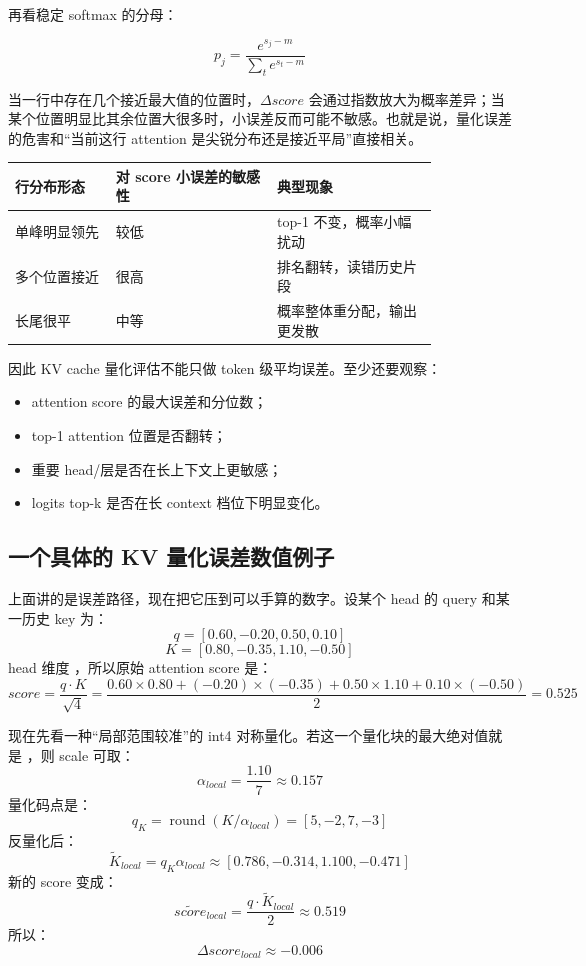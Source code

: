 再看稳定 softmax 的分母：

\[
p_j=\frac{e^{s_j-m}}{\sum_t e^{s_t-m}}
\]

当一行中存在几个接近最大值的位置时，\(\Delta score\) 会通过指数放大为概率差异；当某个位置明显比其余位置大很多时，小误差反而可能不敏感。也就是说，量化误差的危害和“当前这行 attention 是尖锐分布还是接近平局”直接相关。

\begin{center}
\begin{tabular}{p{0.20\linewidth}p{0.32\linewidth}p{0.32\linewidth}}
\toprule
行分布形态 & 对 score 小误差的敏感性 & 典型现象 \\
\midrule
单峰明显领先 & 较低 & top-1 不变，概率小幅扰动 \\
多个位置接近 & 很高 & 排名翻转，读错历史片段 \\
长尾很平 & 中等 & 概率整体重分配，输出更发散 \\
\bottomrule
\end{tabular}
\end{center}

因此 KV cache 量化评估不能只做 token 级平均误差。至少还要观察：

\begin{itemize}
  \item attention score 的最大误差和分位数；
  \item top-1 attention 位置是否翻转；
  \item 重要 head/层是否在长上下文上更敏感；
  \item logits top-k 是否在长 context 档位下明显变化。
\end{itemize}

\subsection{一个具体的 KV 量化误差数值例子}

上面讲的是误差路径，现在把它压到可以手算的数字。设某个 head 的 query 和某一历史 key 为：
\[
q=[0.60,-0.20,0.50,0.10]
\]
\[
K=[0.80,-0.35,1.10,-0.50]
\]
head 维度 ，所以原始 attention score 是：
\[
score=\frac{q\cdot K}{\sqrt{4}}
=
\frac{0.60\times 0.80+(-0.20)\times(-0.35)+0.50\times1.10+0.10\times(-0.50)}{2}
=0.525
\]

现在先看一种“局部范围较准”的 int4 对称量化。若这一个量化块的最大绝对值就是 ，则 scale 可取：
\[
\alpha_{local}=\frac{1.10}{7}\approx 0.157
\]
量化码点是：
\[
q_K=\operatorname{round}(K/\alpha_{local})=[5,-2,7,-3]
\]
反量化后：
\[
\tilde{K}_{local}=q_K\alpha_{local}
\approx
[0.786,-0.314,1.100,-0.471]
\]
新的 score 变成：
\[
\tilde{score}_{local}
=
\frac{q\cdot \tilde{K}_{local}}{2}
\approx 0.519
\]
所以：
\[
\Delta score_{local}\approx -0.006
\]

